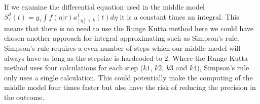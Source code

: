 If we examine the differential equation used in the middle model \\$S_\tau^d(t) = g_\tau \int f(\eta|\tau)a_{[\eta] + k}^I(t)d\eta$ it is a constant times an integral. This means that there is no need to use the Runge Kutta method here we could have chosen another approach for integral approximating such as Simpson's rule\cite{simp}. Simpson's rule requires a even number of steps which our middle model will always have as long as the stepsize is hardcoded to 2. Where the Runge Kutta method uses four calculations for each step ($k1$, $k2$, $k3$ and $k4$), Simpson's rule only uses a single calculation. This could potentially make the computing of the middle model four times faster but also have the risk of reducing the precision in the outcome. 
